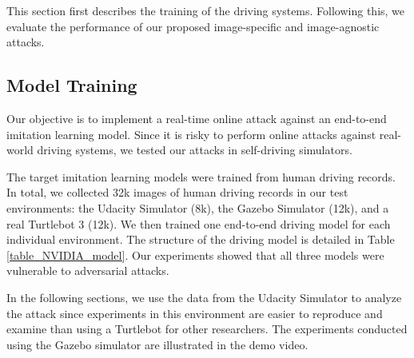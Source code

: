 This section first describes the training of the driving systems. Following this, we evaluate the performance of our proposed image-specific and image-agnostic attacks.



\subsection{Model Training}

Our objective is to implement a real-time online attack against an end-to-end imitation learning model. Since it is risky to perform online attacks against real-world driving systems, we tested our attacks in self-driving simulators. 

The target imitation learning models were trained from human driving records. In total, we collected 32k images of human driving records in our test environments: the Udacity Simulator (8k), the Gazebo Simulator (12k), and a real Turtlebot 3 (12k). We then trained one end-to-end driving model for each individual environment. The structure of the driving model is detailed in Table \ref{table_NVIDIA_model}.
Our experiments showed that all three models were vulnerable to adversarial attacks. 

In the following sections, we use the data from the Udacity Simulator to analyze the attack since experiments in this environment are easier to reproduce and examine than using a Turtlebot for other researchers. The experiments conducted using the Gazebo simulator are illustrated in the demo video.



